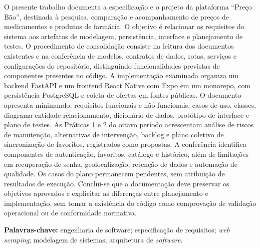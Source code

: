 \documentclass[
    12pt,
    openright,
    oneside,
    a4paper,
    english,
    brazil
    ]{abntex2}
\begin{document}
\hypersetup{pageanchor=false}
\imprimircapa
\hypersetup{pageanchor=true}
\imprimirfolhaderosto

\setlength{\absparsep}{18pt} %
\begin{resumo}
O presente trabalho documenta a especificação e o projeto da plataforma ``Preço Bão'', destinada à pesquisa, comparação e acompanhamento de preços de medicamentos e produtos de farmácia. O objetivo é relacionar os requisitos do sistema aos artefatos de modelagem, persistência, interface e planejamento de testes. O procedimento de consolidação consiste na leitura dos documentos existentes e na conferência de modelos, contratos de dados, rotas, serviços e configurações do repositório, distinguindo funcionalidades previstas de componentes presentes no código. A implementação examinada organiza um backend FastAPI e um frontend React Native com Expo em um monorepo, com persistência PostgreSQL e coleta de ofertas em fontes públicas. O documento apresenta minimundo, requisitos funcionais e não funcionais, casos de uso, classes, diagrama entidade-relacionamento, dicionário de dados, protótipo de interface e plano de testes. As Práticas 1 e 2 do oitavo período acrescentam análise de riscos de manutenção, alternativas de intervenção, backlog e plano coletivo de sincronização de favoritos, registrados como propostas. A conferência identifica componentes de autenticação, favoritos, catálogo e histórico, além de limitações em recuperação de senha, geolocalização, retenção de dados e automação de qualidade. Os casos do plano permanecem pendentes, sem atribuição de resultados de execução. Conclui-se que a documentação deve preservar os objetivos aprovados e explicitar as diferenças entre planejamento e implementação, sem tomar a existência do código como comprovação de validação operacional ou de conformidade normativa.
\par\vspace{\onelineskip}
\noindent
\textbf{Palavras-chave:} engenharia de software; especificação de requisitos; \textit{web scraping}; modelagem de sistemas; arquitetura de \textit{software}.
\end{resumo}
\end{document}
